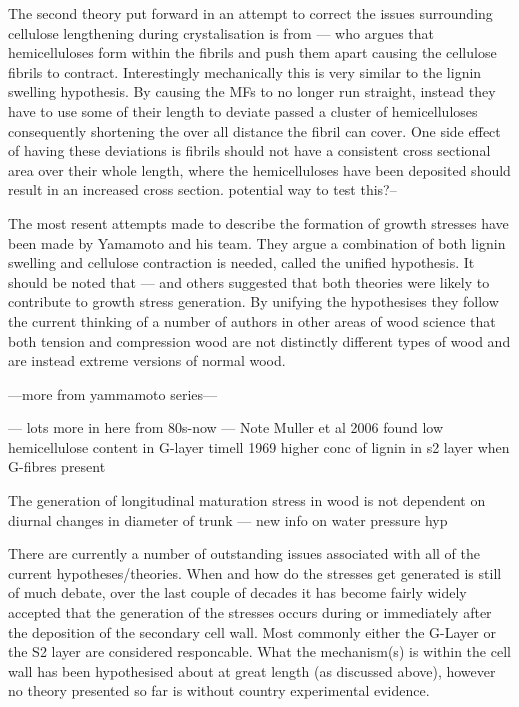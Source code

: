 \documentclass{article}
\begin{document}
The second theory put forward in an attempt to correct the issues surrounding
cellulose lengthening during crystalisation is from --- who argues that
hemicelluloses form within the fibrils and push them apart causing the
cellulose fibrils to contract. Interestingly mechanically this is very similar
to the lignin swelling hypothesis. By causing the MFs to no longer run straight,
instead they have to use some of their length to deviate passed a cluster of
hemicelluloses consequently shortening the over all distance the fibril can
cover. One side effect of having these deviations is fibrils should not have a
consistent cross sectional area over their whole length, where the
hemicelluloses have been deposited should result in an increased cross section.
potential way to test this?--

The most resent attempts made to describe the formation of growth stresses have
been made by Yamamoto and his team. They argue a combination of both lignin
swelling and cellulose contraction is needed, called the unified hypothesis. It
should be noted that --- and others suggested that both theories were likely to
contribute to growth stress generation. By unifying the hypothesises they follow
the current thinking of a number of authors in other areas of wood science that
both tension and compression wood are not distinctly different types of wood and
are instead extreme versions of normal wood.

---more from yammamoto series---

--- lots more in here from 80s-now ---
Note Muller et al 2006 found low hemicellulose content in G-layer
timell 1969 higher conc of lignin in s2 layer when G-fibres present

The generation of longitudinal maturation stress in wood is not dependent on
diurnal changes in diameter of trunk --- new info on water pressure hyp

There are currently a number of outstanding issues associated with all
of the current hypotheses/theories. When and how do the stresses get
generated is still of much debate, over the last couple of decades it has become
fairly widely accepted that the generation of the stresses occurs during or
immediately after the deposition of the secondary cell wall. Most commonly either
the G-Layer or the S2 layer are considered responcable. What the mechanism(s)
is within the cell wall has been hypothesised about at great length (as
discussed above), however no theory presented so far is without country
experimental evidence.
\end{document}
